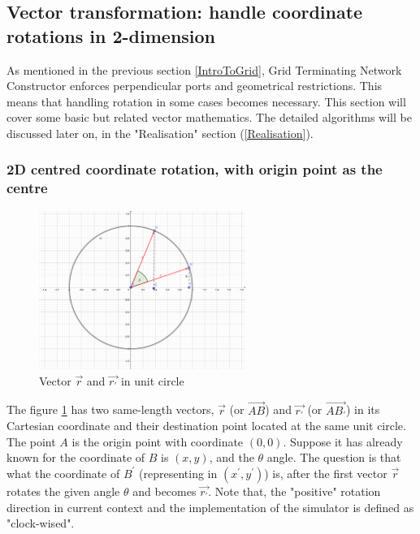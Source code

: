 \subsection{Vector transformation: handle coordinate rotations in 2-dimension}


\par\noindent
As mentioned in the previous section \ref{IntroToGrid}, Grid Terminating Network Constructor enforces perpendicular ports
and geometrical restrictions. This means that handling rotation in some cases becomes necessary.
This section will cover some basic but related vector mathematics. The detailed algorithms will be discussed later on, in the "Realisation" section (\ref{Realisation}).

\subsubsection{2D centred coordinate rotation, with origin point as the centre}

\par\noindent

\begin{figure}[H]
\begin{center}
\includegraphics[width=0.6\textwidth]{context/diagram/2d_vector.pdf}
\caption{Vector $\vec{r}$ and $\vec{r_{'}}$ in unit circle}

\label{vectorG}
\end{center}
\end{figure}

\par\noindent
The figure \ref{vectorG} has two same-length vectors,  $\vec{r}$ (or $\vec{AB}$) and $\vec{r_{'}}$ (or $\vec{AB_{'}}$) in its Cartesian coordinate and their destination point located at the same unit circle.
The point $A$ is the origin point with coordinate $(0, 0)$. Suppose it has already known for the coordinate of $B$ is
$(x,y)$, and the $\theta$ angle. The question is that what the coordinate of $B^{'} $ (representing in $(x^{'},y^{'})$) is, after the first vector $\vec{r}$ rotates the given angle $\theta$ and becomes $\vec{r_{'}}$.
Note that, the "positive" rotation direction in current context and the implementation of the simulator is defined as "clock-wised".

